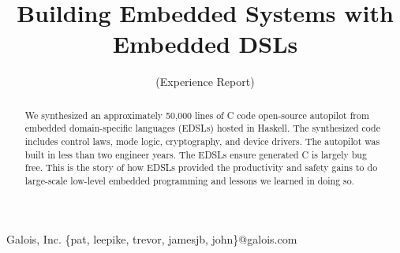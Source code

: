\documentclass{sigplanconf}
\begin{document}
\setlength{\pdfpageheight}{\paperheight}
\setlength{\pdfpagewidth}{\paperwidth}






\title{Building Embedded Systems with Embedded DSLs}
\subtitle{(Experience Report)}

           {Galois, Inc.}
           {\{pat, leepike, trevor, jamesjb, john\}@galois.com}

\maketitle

\begin{abstract}
We synthesized an approximately 50,000 lines of C code open-source autopilot
from embedded domain-specific languages (EDSLs) hosted in Haskell.  The
synthesized code includes control laws, mode logic, cryptography, and device
drivers.  The autopilot was built in less than two engineer years.  The EDSLs
ensure generated C is largely bug free.  This is the story of how EDSLs provided
the productivity and safety gains to do large-scale low-level embedded
programming and lessons we learned in doing so.
\end{abstract}


\end{document}
